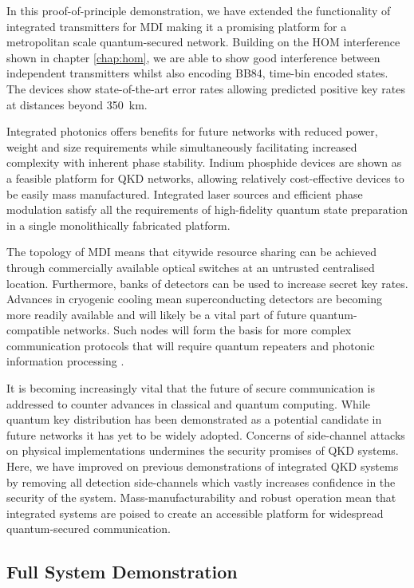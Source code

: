 In this proof-of-principle demonstration, we have extended the functionality of integrated transmitters for \acl{MDI} making it a promising platform for a metropolitan scale quantum-secured network. Building on the \acl{HOM} interference shown in chapter \ref{chap:hom}, we are able to show good interference between independent transmitters whilst also encoding BB84, time-bin encoded states. The devices show state-of-the-art error rates allowing predicted positive key rates at distances beyond \SI{350}{\km}.

Integrated photonics offers benefits for future networks with reduced power, weight and size requirements while simultaneously facilitating increased complexity with inherent phase stability. Indium phosphide devices are shown as a feasible platform for \ac{QKD} networks, allowing relatively cost-effective devices to be easily mass manufactured. Integrated laser sources and efficient phase modulation satisfy all the requirements of high-fidelity quantum state preparation in a single monolithically fabricated platform. 

The topology of \ac{MDI} means that citywide resource sharing can be achieved through commercially available optical switches at an untrusted centralised location. Furthermore, banks of detectors can be used to increase secret key rates. Advances in cryogenic cooling mean superconducting detectors are becoming more readily available and will likely be a vital part of future quantum-compatible networks. Such nodes will form the basis for more complex communication protocols that will require quantum repeaters and photonic information processing \cite{wehner2018}. 

It is becoming increasingly vital that the future of secure communication is addressed to counter advances in classical and quantum computing. While quantum key distribution has been demonstrated as a potential candidate in future networks it has yet to be widely adopted. Concerns of side-channel attacks on physical implementations undermines the security promises of \ac{QKD} systems. Here, we have improved on previous demonstrations of integrated \ac{QKD} systems by removing all detection side-channels which vastly increases confidence in the security of the system. Mass-manufacturability and robust operation mean that integrated systems are poised to create an accessible platform for widespread quantum-secured communication.

\subsection{Full System Demonstration}

